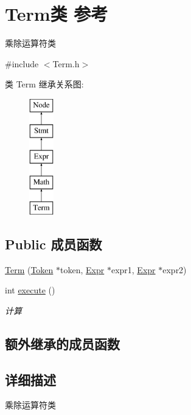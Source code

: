\hypertarget{class_term}{}\section{Term类 参考}
\label{class_term}


乘除运算符类  




{\ttfamily \#include $<$Term.\+h$>$}

类 Term 继承关系图\+:\begin{figure}[H]
\begin{center}
\leavevmode
\includegraphics[height=5.000000cm]{class_term}
\end{center}
\end{figure}
\subsection*{Public 成员函数}
\begin{DoxyCompactItemize}
\item 
\hyperlink{class_term_aee8491368db463879893b7f374d5d835}{Term} (\hyperlink{class_token}{Token} $\ast$token, \hyperlink{class_expr}{Expr} $\ast$expr1, \hyperlink{class_expr}{Expr} $\ast$expr2)
\item 
int \hyperlink{class_term_ac2d20115da73f9425e5d390856a211a1}{execute} ()\hypertarget{class_term_ac2d20115da73f9425e5d390856a211a1}{}\label{class_term_ac2d20115da73f9425e5d390856a211a1}

\begin{DoxyCompactList}\small\item\em 计算 \end{DoxyCompactList}\end{DoxyCompactItemize}
\subsection*{额外继承的成员函数}


\subsection{详细描述}
乘除运算符类 

